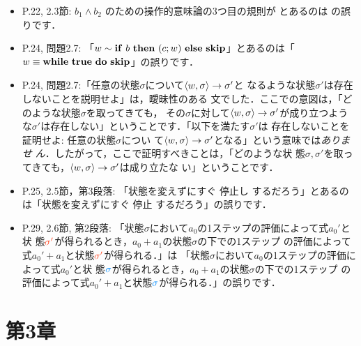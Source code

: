 \documentclass[12pt,titlepage,twoside,openright,dvipdfmx]{jsbook}
\newcommand\old[1]{%
  \textcolor[rgb]{1.0,0.25,0.1}{#1}%
  }
\newcommand\new[1]{%
  \textcolor[rgb]{0,0.55,1.0}{#1}%
  }
\theoremstyle{definition}
\begin{document}
\begin{itemize}
  \item P.22, 2.3節: $b_1 \land b_2$ のための操作的意味論の3つ目の規則が
    \infrule
    { \arrow \Ttrue \andalso {} \arrow \Ttrue}
    { \arrow \old{\Tfalse}}
    とあるのは
    \infrule
    { \arrow \Ttrue \andalso {} \arrow \Ttrue}
    { \arrow \new{\Ttrue}}
    の誤りです．
  \item P.24, 問題2.7: 「$w \sim \mathbf{if}\ b\ \mathbf{then}\ (c;w)\ \mathbf{else}\ \mathbf{skip}$」とあるのは「$w \equiv \mathbf{while}\ \mathbf{true}\ \mathbf{do}\ \mathbf{skip}$」の誤りです．
  \item P.24,
    問題2.7:「任意の状態$\sigma$について$\langle{w,\sigma}\rangle\to \sigma'$と
    なるような状態$\sigma'$は存在しないことを説明せよ」は，曖昧性のある
    文でした．ここでの意図は，「どのような状態$\sigma$を取ってきても，
    その$\sigma$に対して$\langle{w,\sigma}\rangle\to \sigma'$が成り立つよう
    な$\sigma'$は存在しない」ということです．「以下を満たす$\sigma'$は
    存在しないことを証明せよ: 任意の状態$\sigma$につい
    て$\langle{w,\sigma}\rangle\to \sigma'$となる」という意味では\emph{ありませ
      ん}．したがって，ここで証明すべきことは，「どのような状
    態$\sigma,
    \sigma'$を取ってきても，$\langle{w,\sigma}\rangle \to \sigma'$は成り立たな
    い」ということです．
  \item P.25, 2.5節，第3段落: 「状態を変えずにすぐ\old{停止し}するだろう」とあるのは「状態を変えずにすぐ\new{停止}するだろう」の誤りです．
  \item P.29, 2.6節, 第2段落:
    「状態$\sigma$において$a_0$の1ステップの評価によって式$a_0'$と状
    態$\old{\sigma'}$が得られるとき，$a_0+a_1$の状態$\sigma$の下での1ステップ
    の評価によって式$a_0'+a_1$と状態$\old{\sigma'}$が得られる．」は
    「状態$\sigma$において$a_0$の1ステップの評価によって式$a_0'$と状
    態$\new{\sigma}$が得られるとき，$a_0+a_1$の状態$\sigma$の下での1ステップ
    の評価によって式$a_0'+a_1$と状態$\new{\sigma}$が得られる．」の誤りです．
\end{itemize}

\section*{第3章}

\newcommand{\AexpBinPropB}{
  \forall{a_0,a_1\in\mathbf{Aexp},\sigma\in\Sigma,m,n\in\mathbf{N}}. \\ &
  \tuple{a_0,\sigma}\rightarrow m \AND
  \tuple{a_1,\sigma}\rightarrow n \AND
}
\end{document}
